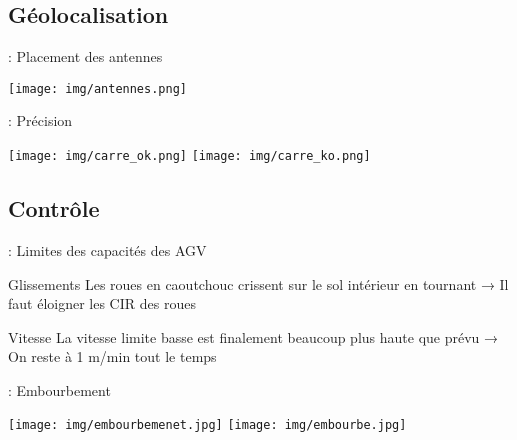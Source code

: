 \documentclass[12pt]{beamer}
\begin{document}
        \subsection{Géolocalisation}
            \begin{frame}{\subsecname: Placement des antennes}
                \vspace{-0.4cm}
                \begin{center}
                    \texttt{[image: img/antennes.png]}
                \end{center}
            \end{frame}
            \begin{frame}{\subsecname: Précision}
                \begin{center}
                    \texttt{[image: img/carre\_ok.png]} \pause
                    \texttt{[image: img/carre\_ko.png]}
                \end{center}
            \end{frame}
        \subsection{Contrôle}
            \begin{frame}{\subsecname: Limites des capacités des AGV}
                \begin{block}{Glissements}
                    Les roues en caoutchouc crissent sur le sol intérieur en tournant → Il faut éloigner les CIR des roues
                \end{block}
                \begin{block}{Vitesse}
                    La vitesse limite basse est finalement beaucoup plus haute que prévu → On reste à 1 m/min tout le temps
                \end{block}
            \end{frame}
            \begin{frame}{\subsecname: Embourbement}
                \begin{center}
                    \texttt{[image: img/embourbemenet.jpg]}
                    \texttt{[image: img/embourbe.jpg]}
                \end{center}
            \end{frame}
\end{document}
